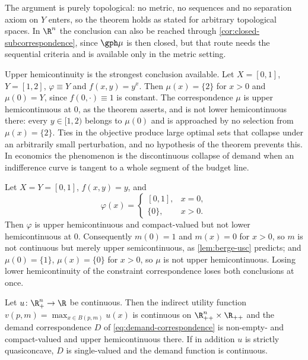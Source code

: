 The argument is purely topological: no metric, no sequences and no separation
axiom on $Y$ enters, so the theorem holds as stated for arbitrary topological
spaces. In $\R^n$ the conclusion can also be reached through
\autoref{cor:closed-subcorrespondence}, since $\gph\mu$ is then closed, but that
route needs the sequential criteria and is available only in the metric setting.

\begin{remark}\label{rem:berge-not-lhc}
	Upper hemicontinuity is the strongest conclusion available. Let $X=[0,1]$,
	$Y=[1,2]$, $\varphi\equiv Y$ and $f(x,y)=y^{x}$. Then
	$\mu(x)=\{2\}$ for $x>0$ and $\mu(0)=Y$, since $f(0,\cdot)\equiv1$ is constant.
	The correspondence $\mu$ is upper hemicontinuous at $0$, as the theorem
	asserts, and is not lower hemicontinuous there: every $y\in[1,2)$ belongs to
	$\mu(0)$ and is approached by no selection from $\mu(x)=\{2\}$. Ties in the
	objective produce large optimal sets that collapse under an arbitrarily small
	perturbation, and no hypothesis of the theorem prevents this. In economics the
	phenomenon is the discontinuous collapse of demand when an indifference curve
	is tangent to a whole segment of the budget line.
\end{remark}

\begin{eg}\label{eg:berge-failure}
	Let $X=Y=[0,1]$, $f(x,y)=y$, and
	\[
		\varphi(x)=\begin{cases}[0,1], & x=0, \\ \{0\}, & x>0.\end{cases}
	\]
	Then $\varphi$ is upper hemicontinuous and compact-valued but not lower
	hemicontinuous at $0$. Consequently $m(0)=1$ and $m(x)=0$ for $x>0$, so $m$ is
	not continuous but merely upper semicontinuous, as
	\autoref{lem:berge-usc} predicts; and $\mu(0)=\{1\}$, $\mu(x)=\{0\}$ for
	$x>0$, so $\mu$ is not upper hemicontinuous. Losing lower hemicontinuity of
	the constraint correspondence loses both conclusions at once.
\end{eg}

\begin{corollary}\label{cor:demand-uhc}
	Let $u\colon\R^{n}_{+}\to\R$ be continuous. Then the indirect utility function
	$v(p,m)=\max_{x\in B(p,m)}u(x)$ is continuous on
	$\R^{n}_{++}\times\R_{++}$ and the demand correspondence $D$ of
	\eqref{eq:demand-correspondence} is non-empty- and compact-valued and upper
	hemicontinuous there. If in addition $u$ is strictly quasiconcave, $D$ is
	single-valued and the demand function is continuous.
\end{corollary}

